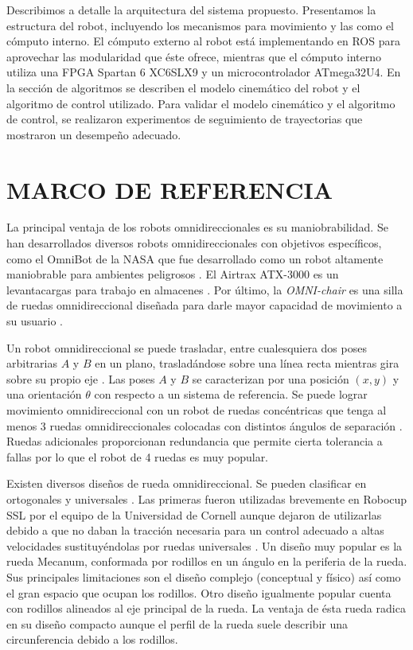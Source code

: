 \documentclass[twocolumn,10pt]{amrob}
\newcommand{\TODO}[1]{{\color{red}{ToDo: {#1}}}}
\begin{document}
\TODO{actualizar la estructura del texto}
Describimos a detalle la arquitectura del sistema propuesto. Presentamos la estructura del robot, incluyendo los mecanismos para movimiento y las como el cómputo interno. El cómputo externo al robot está implementando en ROS para aprovechar las modularidad que éste ofrece, mientras que el cómputo interno utiliza una FPGA Spartan 6 XC6SLX9 y un microcontrolador ATmega32U4. En la sección de algoritmos se describen el modelo cinemático del robot y el algoritmo de control utilizado. Para validar el modelo cinemático y el algoritmo de control, se realizaron experimentos de seguimiento de trayectorias que mostraron un desempeño adecuado.


\section*{MARCO DE REFERENCIA}
\label{sec:marco_ref}
La principal ventaja de los robots omnidireccionales es su maniobrabilidad. Se han desarrollados diversos robots omnidireccionales con objetivos específicos, como el OmniBot de la NASA que fue desarrollado como un robot altamente maniobrable para ambientes peligrosos \cite{houshangi1999omnibot}. El Airtrax ATX-3000 es un levantacargas para trabajo en almacenes \cite{aduascualictei2011practical}. Por último, la \textit{OMNI-chair} es una silla de ruedas omnidireccional diseñada para darle mayor capacidad de movimiento a su usuario \cite{borgolte1998architectural}.

Un robot omnidireccional se puede trasladar, entre cualesquiera dos poses arbitrarias $A$ y $B$ en un plano, trasladándose sobre una línea recta mientras gira sobre su propio eje \cite{rojas2005short}. Las poses $A$ y $B$ se caracterizan por una posición $(x,y)$ y una orientación $\theta$ con respecto a un sistema de referencia. Se puede lograr movimiento omnidireccional con un robot de ruedas concéntricas que tenga al menos 3 ruedas omnidireccionales colocadas con distintos ángulos de separación \cite{rojas2006holonomic}. Ruedas adicionales proporcionan redundancia que permite cierta tolerancia a fallas por lo que el robot de 4 ruedas es muy popular.

Existen diversos diseños de rueda omnidireccional. Se pueden clasificar en ortogonales y universales \cite{ashmore2002omni}. Las primeras fueron utilizadas brevemente en Robocup SSL por el equipo de la Universidad de Cornell \cite{d2000cornell} aunque dejaron de utilizarlas debido a que no daban la tracción necesaria para un control adecuado a altas velocidades sustituyéndolas por ruedas universales \cite{purwin2003cornell}. Un diseño muy popular es la rueda Mecanum, conformada por rodillos en un ángulo en la periferia de la rueda. Sus principales limitaciones son el diseño complejo (conceptual y físico) así como el gran espacio que ocupan los rodillos. Otro diseño igualmente popular cuenta con rodillos alineados al eje principal de la rueda. La ventaja de ésta rueda radica en su diseño compacto aunque el perfil de la rueda suele describir una circunferencia debido a los rodillos. 
\end{document}
